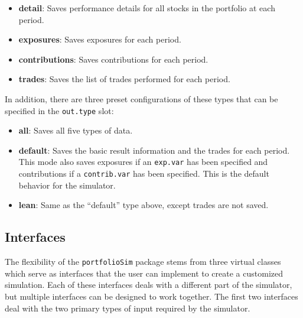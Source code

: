 \documentclass{article}
\begin{document}
\begin{itemize}
\begin{itemize}
\item{\bf{detail}}: Saves performance details for all stocks in the
portfolio at each period.

\item{\bf{exposures}}: Saves exposures for each period.

\item{\bf{contributions}}: Saves contributions for each period.

\item{\bf{trades}}: Saves the list of trades performed for each
period.

\end{itemize}

In addition, there are three preset configurations of these types that
can be specified in the \texttt{out.type} slot:

\begin{itemize}

\item{\bf{all}}: Saves all five types of data.

\item{\bf{default}}: Saves the basic result information and the trades
for each period.  This mode also saves exposures if an
\texttt{exp.var} has been specified and contributions if a
\texttt{contrib.var} has been specified.  This is the default behavior
for the simulator.

\item{\bf{lean}}: Same as the ``default'' type above, except trades
are not saved.

\end{itemize}

\end{itemize}


\subsection{Interfaces}

The flexibility of the \texttt{portfolioSim} package stems from three
virtual classes which serve as interfaces that the user can implement
to create a customized simulation.  Each of these interfaces deals
with a different part of the simulator, but multiple interfaces can be
designed to work together.  The first two interfaces deal with the two
primary types of input required by the simulator.
\end{document}
